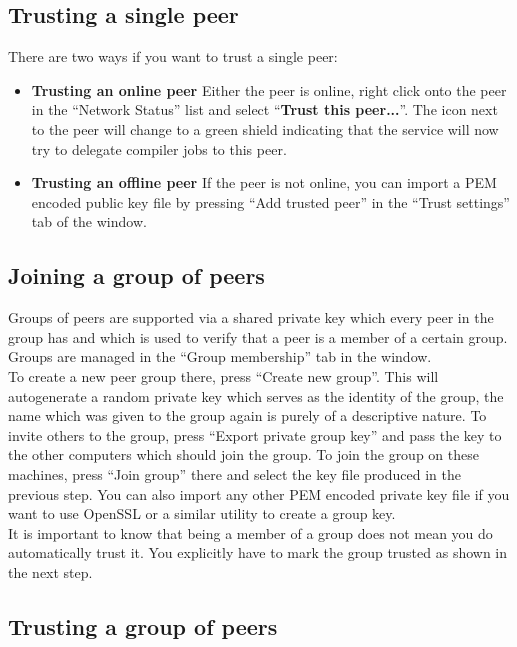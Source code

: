 \documentclass[a4paper,9pt]{scrartcl}
\begin{document}
\subsection{Trusting a single peer}
There are two ways if you want to trust a single peer:\\
\smallskip
\begin{itemize}
  \item{\bf Trusting an online peer} Either the peer is online, right click onto the peer in the ``Network Status'' list and select ``\textbf{Trust this peer...}''. The icon next to the peer will change to a green shield indicating that the service will now try to delegate compiler jobs to this peer.
  \item{\bf Trusting an offline peer} If the peer is not online, you can import a PEM encoded public key file by pressing ``Add trusted peer'' in the ``Trust settings'' tab of the window.
\end{itemize}


\subsection{Joining a group of peers}

Groups of peers are supported via a shared private key which every peer in the group has and which is used to verify that a peer is a member of a certain group. \\
Groups are managed in the ``Group membership'' tab in the window. \\
To create a new peer group there, press ``Create new group''. This will autogenerate a random private key which serves as the identity of the group, the name which was given to the group again is purely of a descriptive nature. To invite others to the group, press ``Export private group key'' and pass the key to the other computers which should join the group. To join the group on these machines, press ``Join group'' there and select the key file produced in the previous step. You can also import any other PEM encoded private key file if you want to use OpenSSL or a similar utility to create a group key.\\
\smallskip
It is important to know that being a member of a group does not mean you do automatically trust it. You explicitly have to mark the group trusted as shown in the next step.

\subsection{Trusting a group of peers}
\end{document}
